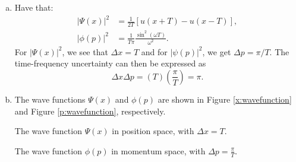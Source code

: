 \begin{enumerate}
\begin{enumerate}[a)]
\item Have that:
\begin{align*}
    |\Psi(x)|^{2} &= \frac{1}{2T}[u(x+T) - u(x-T)], \\
    |\phi(p)|^{2} &= \frac{1}{T\pi}\frac{\sin^{2}(\omega T)}{\omega^{2}}.
\end{align*}
For $|\Psi(x)|^{2}$, we see that $\Delta x = T$ and for $|\psi(p)|^{2}$, we get $\Delta p =\pi/T$. The time-frequency uncertainty can then be expressed as
$$\Delta x\Delta p=(T)\left(\frac{\pi}{T}\right)=\pi.$$

\item The wave functions $\Psi(x)$ and $\phi(p)$ are shown in Figure \ref{x:wavefunction} and Figure \ref{p:wavefunction}, respectively. 
\begin{marginfigure}
\caption{The wave function $\Psi(x)$ in position space, with $\Delta x=T$.}
\label{x:wavefunction}
\end{marginfigure}

\begin{marginfigure}
\caption{The wave function $\phi(p)$ in momentum space, with $\Delta p=\frac{\pi}{T}$.}
\label{p:wavefunction}
\end{marginfigure}




\end{enumerate}
\end{enumerate}
